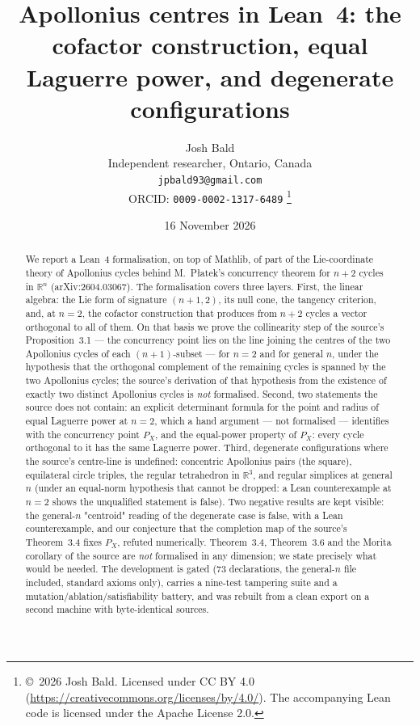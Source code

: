 \documentclass[11pt]{article}
\title{Apollonius centres in Lean~4: the cofactor construction, equal Laguerre power, and degenerate configurations}
\author{Josh Bald\\ \small Independent researcher, Ontario, Canada\\ \small\texttt{jpbald93@gmail.com}\\
\small ORCID: \texttt{0009-0002-1317-6489}
\thanks{\copyright~2026 Josh Bald. Licensed under CC BY 4.0
(\url{https://creativecommons.org/licenses/by/4.0/}). The accompanying Lean code is licensed under
the Apache License 2.0.}}
\date{16 November 2026}
\theoremstyle{definition}
\theoremstyle{remark}
\newcommand{\RR}{\mathbb{R}}
\begin{document}
\sloppy
\maketitle

\begin{abstract}
We report a Lean~4 formalisation, on top of Mathlib, of part of the Lie-coordinate theory of
Apollonius cycles behind M.~Płatek's concurrency theorem for $n+2$ cycles in $\RR^n$
(arXiv:2604.03067). The formalisation covers three layers. First, the linear algebra: the
Lie form of signature $(n+1,2)$, its null cone, the tangency criterion, and, at $n=2$, the cofactor
construction that produces from $n+2$ cycles a vector orthogonal to all of them. On that basis we prove the
collinearity step of the source's Proposition~3.1 --- the concurrency point lies on the line joining
the centres of the two Apollonius cycles of each $(n+1)$-subset --- for $n=2$ and for general $n$,
under the hypothesis that the orthogonal complement of the remaining cycles is spanned by the two
Apollonius cycles; the source's derivation of that hypothesis from the existence of exactly two
distinct Apollonius cycles is \emph{not} formalised. Second, two statements the source does not
contain: an explicit determinant formula for the point and radius of equal Laguerre power at $n=2$,
which a hand argument --- not formalised --- identifies with the concurrency point $P_X$, and the
equal-power property of $P_X$: every cycle orthogonal to it has the same Laguerre power. Third, degenerate configurations where the source's centre-line is
undefined: concentric Apollonius pairs (the square), equilateral circle triples, the regular
tetrahedron in $\RR^3$, and regular simplices at general $n$ (under an equal-norm hypothesis that cannot be dropped: a Lean
counterexample at $n=2$ shows the unqualified statement is false). Two negative results are kept visible: the general-$n$ "centroid" reading of the
degenerate case is false, with a Lean counterexample, and our conjecture that the completion map of the
source's Theorem~3.4 fixes $P_X$, refuted numerically. Theorem~3.4, Theorem~3.6 and the Morita corollary
of the source are \emph{not} formalised in any dimension; we state precisely what would be needed.
The development is gated (73 declarations, the general-$n$ file included, standard axioms only), carries a nine-test tampering
suite and a mutation/ablation/satisfiability battery, and was rebuilt from a clean export on a second
machine with byte-identical sources.
\end{abstract}
\end{document}
